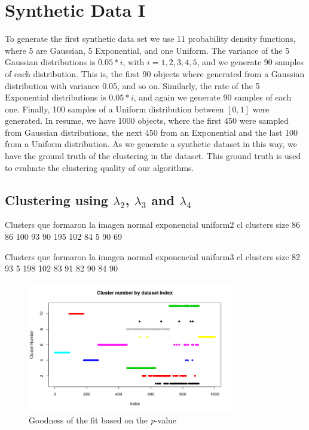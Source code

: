 \section{Synthetic Data I}
To generate the first synthetic data set we use 11 probability density functions, where 5 are Gaussian, 5 Exponential, and one Uniform. The variance of the 5 Gaussian distributions is $0.05*i$, with $i=1, 2, 3, 4, 5$, and we generate 90 samples of each distribution. This is, the first 90 objects where generated from a Gaussian distribution with variance 0.05, and so on. Similarly, the rate of the 5 Exponential distributions is $0.05*i$, and again we generate 90 samples of each one. Finally, 100 samples of a Uniform distribution between $[0, 1]$ were generated. In resume, we have 1000 objects, where the first 450 were sampled from Gaussian distributions, the next 450 from an Exponential and the last 100 from a Uniform distribution. As we generate a synthetic dataset in this way, we have the ground truth of the clustering in the dataset. This ground truth is used to evaluate the clustering quality of our algorithms.

\subsection{Clustering using $\lambda_{2}$, $\lambda_{3}$ and $\lambda_{4}$}

Clusters que formaron la imagen normal exponencial uniform2
cl clusters size
   86  86 100  93  90 195 102  84   5  90  69
 
Clusters que formaron la imagen normal exponencial uniform3 
 cl clusters size
   82  93   5 198 102  83  91  82  90  84  90

\begin{figure}[H]
    \centering
    \includegraphics[width=0.8\textwidth]{img/gld_clustering/Dataset1/l2_l3_l4/normal_exponential_uniform2.png}
    \caption{Goodness of the fit based on the \textit{p}-value}
    \label{fig:p_value}
\end{figure}


